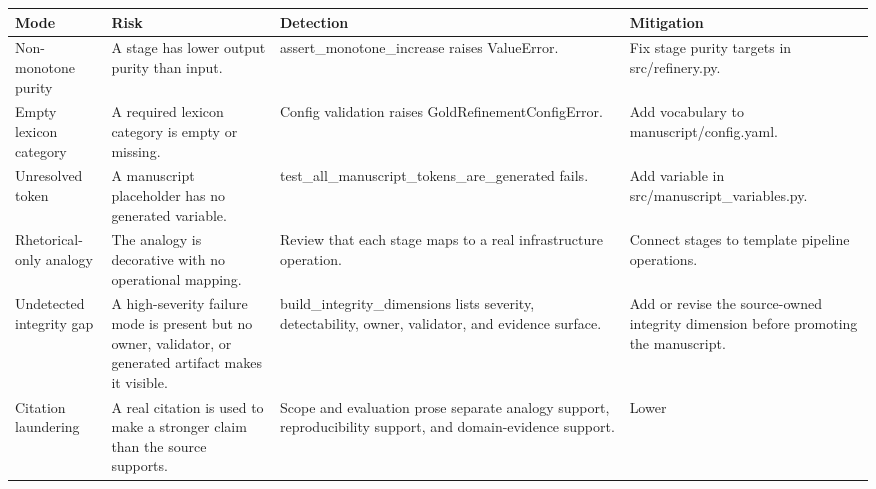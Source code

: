 \documentclass[
  english,
]{article}
\newcounter{none} %
\begin{document}
{\def\LTcaptype{none} %
\begin{longtable}[]{@{}
  >{\raggedright\arraybackslash}p{}
  >{\raggedright\arraybackslash}p{}
  >{\raggedright\arraybackslash}p{}
  >{\raggedright\arraybackslash}p{}@{}}
\toprule\noalign{}
\begin{minipage}[b]{\linewidth}\raggedright
Mode
\end{minipage} & \begin{minipage}[b]{\linewidth}\raggedright
Risk
\end{minipage} & \begin{minipage}[b]{\linewidth}\raggedright
Detection
\end{minipage} & \begin{minipage}[b]{\linewidth}\raggedright
Mitigation
\end{minipage} \\
\midrule\noalign{}
\endhead
\bottomrule\noalign{}
\endlastfoot
Non-monotone purity & A stage has lower output purity than input. &
assert\_monotone\_increase raises ValueError. & Fix stage purity targets
in src/refinery.py. \\
Empty lexicon category & A required lexicon category is empty or
missing. & Config validation raises GoldRefinementConfigError. & Add
vocabulary to manuscript/config.yaml. \\
Unresolved token & A manuscript placeholder has no generated variable. &
test\_all\_manuscript\_tokens\_are\_generated fails. & Add variable in
src/manuscript\_variables.py. \\
Rhetorical-only analogy & The analogy is decorative with no operational
mapping. & Review that each stage maps to a real infrastructure
operation. & Connect stages to template pipeline operations. \\
Undetected integrity gap & A high-severity failure mode is present but
no owner, validator, or generated artifact makes it visible. &
build\_integrity\_dimensions lists severity, detectability, owner,
validator, and evidence surface. & Add or revise the source-owned
integrity dimension before promoting the manuscript. \\
Citation laundering & A real citation is used to make a stronger claim
than the source supports. & Scope and evaluation prose separate analogy
support, reproducibility support, and domain-evidence support. & Lower

\end{longtable}}
\end{document}
